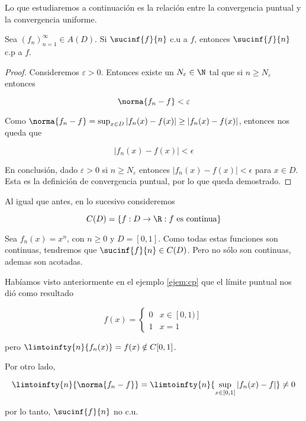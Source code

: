 Lo que estudiaremos a continuación es la relación entre la convergencia puntual y la convergencia uniforme.

\begin{pro}
    Sea $\left(f_n\right)_{n=1}^{\infty} \in A(D)$. Si $\sucinf{f}{n}$ c.u a $f$, entonces $\sucinf{f}{n}$ c.p a $f$.
\end{pro}

\begin{proof}
    Consideremos $\varepsilon > 0$. Entonces existe un $N_{\varepsilon} \in \N$ tal que si $n \geq N_{\varepsilon}$ entonces
    
    \[
    \norma{f_n - f} < \varepsilon
    \]
    
    Como $\norma{f_n - f} = \sup_{x \in D} \left| f_n(x) - f(x) \right| \geq |f_n(x) - f(x)|$, entonces nos queda que
    
    \[
    |f_n(x) - f(x)| < \epsilon
    \]
    
    En conclusión, dado $\varepsilon > 0$ si $n \geq N_{\varepsilon}$ entonces $|f_n(x) - f(x)| < \epsilon$ para $x \in D$. Esta es la definición de convergencia puntual, por lo que queda demostrado.
\end{proof}

\begin{nota}
    Al igual que antes, en lo sucesivo consideremos
    
    \[
    C(D) = \{f: D \rightarrow \R : \text{$f$ es continua}\}
    \]
\end{nota}

\begin{ejem}
    Sea $f_n(x) = x^n$, con $n \geq 0$ y $D = [0,1]$. Como todas estas funciones son continuas, tendremos que $\sucinf{f}{n} \in C(D)$. Pero no sólo son continuas, ademas son acotadas.
    
    Habíamos visto anteriormente en el ejemplo \ref{ejem:cp} que el límite puntual nos dió como resultado
    
    \[
    f(x) = \begin{cases}
        0& x \in [0,1)] \\
        1& x = 1
    \end{cases}
    \]
    
    \noindent pero $\limtoinfty{n}{f_n(x)} = f(x) \notin C[0,1]$.
    
    Por otro lado,
    
    \[
    \limtoinfty{n}{\norma{f_n - f}} = \limtoinfty{n}{\sup_{x \in [0,1]} \left|f_n(x) - f\right|} \neq 0
    \]
    
    \noindent por lo tanto, $\sucinf{f}{n}$ no c.u.
\end{ejem}

